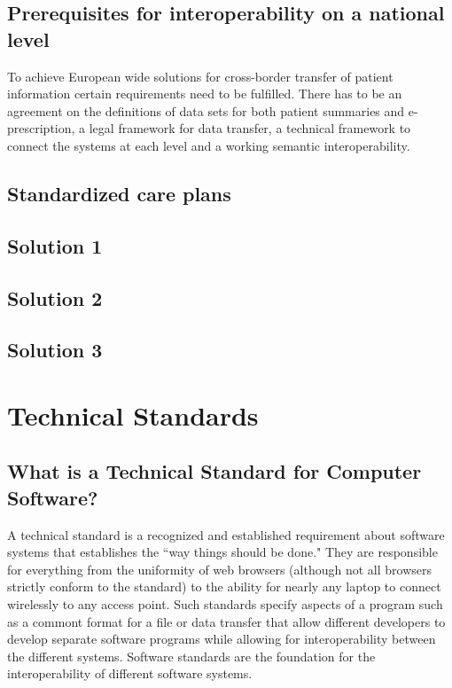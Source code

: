 \documentclass[12pt]{article}
\begin{document}
\subsection{Prerequisites for interoperability on a national level}

To achieve European wide solutions for cross-border transfer of patient information certain requirements need to be fulfilled. There has to be an agreement on the definitions of data sets for both patient summaries and e-prescription, a legal framework for data transfer, a technical framework to connect the systems at each level and a working semantic interoperability. \cite{epSOS1}

\subsection{Standardized care plans}

\subsection{Solution 1}
\subsection{Solution 2}
\subsection{Solution 3}

\newpage

\section{Technical Standards}


\subsection{What is a Technical Standard for Computer Software?}
A technical standard is a recognized and established requirement about software systems that establishes the ``way things should be done." They are responsible for everything from the uniformity of web browsers (although not all browsers strictly conform to the standard) to the ability for nearly any laptop to connect wirelessly to any access point. Such standards specify aspects of a program such as a commont format for a file or data transfer that allow different developers to develop separate software programs while allowing for interoperability between the different systems. Software standards are the foundation for the interoperability of different software systems.
\end{document}
